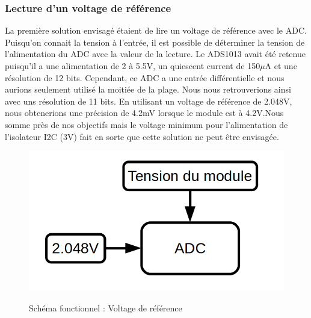 				\subsubsection{Lecture d'un voltage de r\'{e}f\'{e}rence}
					La premi\`{e}re solution envisag\'{e} \'{e}taient de lire un voltage de r\'{e}f\'{e}rence avec le ADC. Puisqu'on connait la tension \`{a} l'entr\'{e}e, il est possible de d\'{e}terminer la tension de l'alimentation du ADC avec la valeur de la lecture. Le ADS1013 avait \'{e}t\'{e} retenue puisqu'il a une alimentation de 2 \`{a} 5.5V, un quiescent current de 150$\mu$A et une r\'{e}solution de 12 bits. Cependant, ce ADC a une entr\'{e}e diff\'{e}rentielle et nous aurions seulement utilis\'{e} la moiti\'{e}e de la plage. Nous nous retrouverions ainsi avec uns r\'{e}solution de 11 bits. En utilisant un voltage de r\'{e}f\'{e}rence de 2.048V, nous obtenerions une pr\'{e}cision de 4.2mV lorsque le module est \`{a} 4.2V.Nous somme pr\`{e}s de nos objectifs mais le voltage minimum pour l'alimentation de l'isolateur I2C (3V) fait en sorte que cette solution ne peut \^{e}tre envisag\'{e}e.
					\begin{figure}[h]
						\centering
						\includegraphics[scale=0.3]{./Lecture/images/Voltage_reference} \\ \vspace{0cm}
						\caption{Sch\'{e}ma fonctionnel : Voltage de r\'{e}f\'{e}rence }
					\end{figure}

				\newpage
